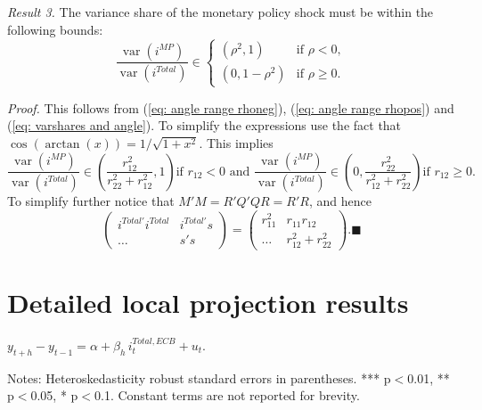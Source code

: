 \documentclass[a4paper,12pt]{article}
\newcommand{\pathTables}{../workm_lp/}
\begin{document}
\noindent\emph{Result 3.} The variance share of the monetary policy shock must be within the following bounds:
\begin{equation}
\frac{\operatorname{var}(i^{MP})}{\operatorname{var}(i^{Total})} \in 
\begin{cases}
(\rho^2,1) & \text{if } \rho<0, \\
(0,1-\rho^2) & \text{if } \rho\ge 0.
\end{cases}\label{eq: ranges varshare1}
\end{equation}

\emph{Proof.}
This follows from (\ref{eq: angle range rhoneg}), (\ref{eq: angle range rhopos}) and (\ref{eq: varshares and angle}).
To simplify the expressions use the fact that $\cos(\arctan(x))=1/\sqrt{1+x^2}$. This implies
\begin{equation}
\frac{\operatorname{var}(i^{MP})}{\operatorname{var}(i^{Total})}\in
\left(\frac{r_{12}^2}{r_{22}^2+r_{12}^2},1\right) \text{if }  r_{12}<0 \text{ and }
\frac{\operatorname{var}(i^{MP})}{\operatorname{var}(i^{Total})}
\in\left(0,\frac{r_{22}^2}{r_{12}^2+r_{22}^2}\right) \text{if }  r_{12}\ge0.
\end{equation}
To simplify further notice that $M'M=R'Q'QR=R'R$, and hence
\begin{equation}
\begin{pmatrix}i^{Total\prime}i^{Total} & i^{Total\prime}s\\ \dots & s's \end{pmatrix}=
\begin{pmatrix}r_{11}^2 & r_{11}r_{12}\\ \dots & r_{12}^2+r_{22} ^2\end{pmatrix}.\blacksquare
\end{equation}

\clearpage

\section{Detailed local projection results}

\renewcommand{\thetable}{\Alph{section}.\arabic{table}}

\renewcommand\textfraction{.02}

\begin{table}[!htbp]
\begin{center}
\caption{The effect of ECB total interest rate surprises on financial variables}\label{tab: reg ecb surp}
$y^{}_{t+h}-y^{}_{t-1} = \alpha + \beta_h\, i^{Total,ECB}_t + u_t.$
\small
{}
\end{center}\footnotesize
Notes: Heteroskedasticity robust standard errors in parentheses. *** p$<$0.01, ** p$<$0.05, * p$<$0.1.
Constant terms are not reported for brevity.
\end{table}
\end{document}

